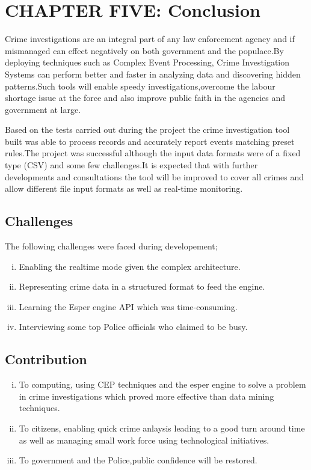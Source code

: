 

\section{CHAPTER FIVE: Conclusion }

\noindent Crime investigations are an integral part of any law enforcement agency and if mismanaged can effect negatively on both government and the populace.By deploying techniques such as Complex Event Processing, Crime Investigation Systems can perform better and faster in analyzing data and discovering hidden patterns.Such tools will enable speedy investigations,overcome the labour shortage issue at the force and also improve public faith in the agencies and government at large.

\noindent Based on the tests carried out during the project the crime investigation tool built was able to process records and accurately report events matching preset rules.The project was successful although the input data formats were of a fixed type (CSV) and some few challenges.It is expected that with further developments and consultations the tool will be improved to cover all crimes and allow different file input formats as well as real-time monitoring.  

\subsection{Challenges}

\noindent The following challenges were faced during developement;

\begin{enumerate}[(i)]
\item Enabling the realtime mode given the complex architecture.
\item Representing crime data in a structured format to feed the engine.
\item Learning the Esper engine API which was time-consuming.
\item Interviewing some top Police officials who claimed to be busy.


\end{enumerate}

\subsection{Contribution}


\begin{enumerate}[(i)]
\item To computing, using CEP techniques and the esper engine to solve a problem in crime investigations which proved more effective than data mining techniques.
\item To citizens, enabling quick crime anlaysis leading to a good turn around time as well as managing small work force using technological initiatives.
\item To government and the Police,public confidence will be restored.


\end{enumerate}

